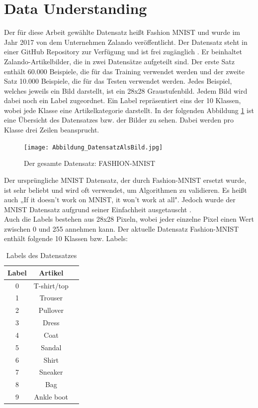 \documentclass[12pt]{scrreprt}
\begin{document}
\section{Data Understanding}
	
Der für diese Arbeit gewählte Datensatz heißt Fashion MNIST und wurde im Jahr 2017 von dem Unternehmen Zalando veröffentlicht. Der Datensatz steht in einer GitHub Repository zur Verfügung und ist frei zugänglich \cite{Zalando2017}. Er beinhaltet Zalando-Artikelbilder, die in zwei Datensätze aufgeteilt sind. Der erste Satz enthält 60.000 Beispiele, die für das Training verwendet werden und der zweite Satz 10.000 Beispiele, die für das Testen verwendet werden. Jedes Beispiel, welches jeweils ein Bild darstellt, ist ein 28x28 Graustufenbild. Jedem Bild wird dabei noch ein Label zugeordnet. Ein Label repräsentiert eins der 10 Klassen, wobei jede Klasse eine Artikelkategorie darstellt. In der folgenden Abbildung \ref{fig:fig7} ist eine Übersicht des Datensatzes bzw. der Bilder zu sehen. Dabei werden pro Klasse drei Zeilen beansprucht.\\
	
\begin{figure}[h!]
	\centering
	\texttt{[image: Abbildung\_DatensatzAlsBild.jpg]}
	\caption{Der gesamte Datensatz: FASHION-MNIST \cite{Abbildung7}}
	\label{fig:fig7}
\end{figure}
	
Der ursprüngliche MNIST Datensatz, der durch Fashion-MNIST ersetzt wurde, ist sehr beliebt und wird oft verwendet, um Algorithmen zu validieren. Es heißt auch „If it doesn't work on MNIST, it won't work at all". Jedoch wurde der MNIST Datensatz aufgrund seiner Einfachheit ausgetauscht \cite{Zalando2017}.\\
	
Auch die Labels bestehen aus 28x28 Pixeln, wobei jeder einzelne Pixel einen Wert zwischen 0 und 255 annehmen kann. Der aktuelle Datensatz Fashion-MNIST enthält folgende 10 Klassen bzw. Labels:

\begin{table}[h!]
	\begin{center}
		\begin{tabular}{|c|c|c|}
			\hline
			Label & Artikel \\
			\hline
			0 & T-shirt/top \\
			\hline
			1 & Trouser \\
			\hline
			2 & Pullover \\
			\hline
			3 & Dress \\
			\hline
			4 & Coat \\
			\hline
			5 & Sandal \\
			\hline
			6 & Shirt \\
			\hline
			7 & Sneaker \\
			\hline
			8 & Bag \\
			\hline
			9 & Ankle boot \\
			\hline
		\end{tabular}
		\caption{Labels des Datensatzes}
		\label{tab:labels}
	\end{center}
\end{table}
	
\end{document}
